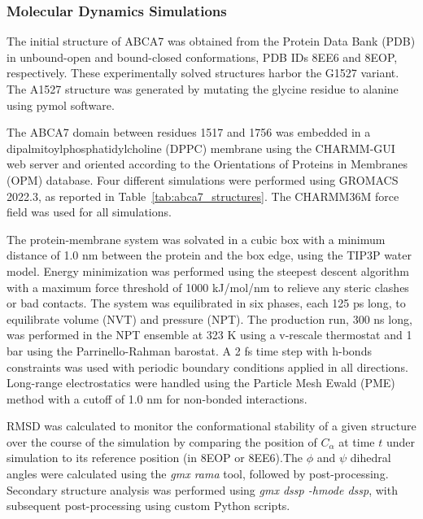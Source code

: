 \subsubsection{Molecular Dynamics Simulations }
The initial structure of ABCA7 was obtained from the Protein Data Bank (PDB) in unbound-open and bound-closed conformations, PDB IDs 8EE6 and 8EOP, respectively. These experimentally solved structures harbor the G1527 variant. The A1527 structure was generated by mutating the glycine residue to alanine using pymol software. 
 
The ABCA7 domain between residues 1517 and 1756 was embedded in a dipalmitoylphosphatidylcholine (DPPC) membrane using the CHARMM-GUI web server and oriented according to the Orientations of Proteins in Membranes (OPM) database. Four different simulations were performed using GROMACS 2022.3, as reported in Table~\ref{tab:abca7_structures}. The CHARMM36M force field was used for all simulations.  
 
The protein-membrane system was solvated in a cubic box with a minimum distance of 1.0 nm between the protein and the box edge, using the TIP3P water model. Energy minimization was performed using the steepest descent algorithm with a maximum force threshold of 1000 kJ/mol/nm to relieve any steric clashes or bad contacts. The system was equilibrated in six phases, each 125 ps long, to equilibrate volume (NVT) and pressure (NPT). The production run, 300 ns long, was performed in the NPT ensemble at 323 K using a v-rescale thermostat and 1 bar using the Parrinello-Rahman barostat. A 2 fs time step with h-bonds constraints was used with periodic boundary conditions applied in all directions. Long-range electrostatics were handled using the Particle Mesh Ewald (PME) method with a cutoff of 1.0 nm for non-bonded interactions. 
 
RMSD was calculated to monitor the conformational stability of a given structure over the course of the simulation by comparing the position of $C_\alpha$ at time $t$ under simulation to its reference position (in 8EOP or 8EE6).The $\phi$ and $\psi$ dihedral angles were calculated using the \textit{gmx rama} tool, followed by post-processing. Secondary structure analysis was performed using \textit{gmx dssp -hmode dssp}, with subsequent post-processing using custom Python scripts.
 
